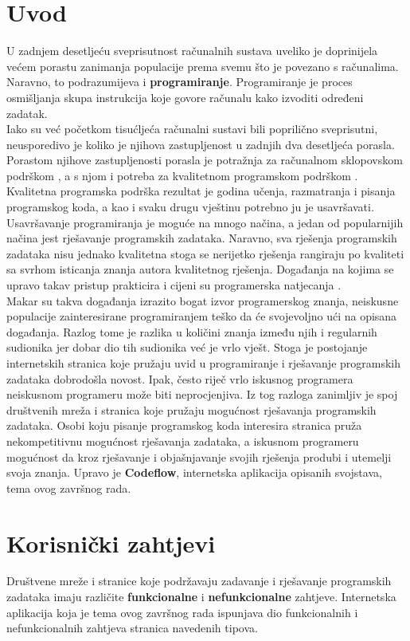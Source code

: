 \documentclass[times, utf8, zavrsni, numeric]{fer}
\begin{document}
	\chapter{Uvod}
	U zadnjem desetljeću sveprisutnost računalnih sustava uveliko je doprinijela većem porastu zanimanja populacije prema svemu što je povezano s računalima.  Naravno, to podrazumijeva i  \textbf{programiranje}. Programiranje je proces osmišljanja skupa instrukcija koje govore računalu kako izvoditi određeni zadatak.\\
	Iako su već početkom tisućljeća računalni sustavi bili poprilično sveprisutni, neusporedivo je koliko je njihova zastupljenost u zadnjih dva desetljeća porasla. Porastom njihove zastupljenosti porasla je potražnja za računalnom sklopovskom podrškom , a s njom i potreba za kvalitetnom programskom podrškom . Kvalitetna programska podrška rezultat je godina učenja, razmatranja i pisanja programskog koda, a kao i svaku drugu vještinu potrebno ju je usavršavati. Usavršavanje programiranja je moguće na mnogo načina, a jedan od popularnijih načina jest rješavanje programskih zadataka. Naravno, sva rješenja programskih zadataka nisu jednako kvalitetna stoga se nerijetko rješenja rangiraju po kvaliteti sa svrhom isticanja znanja autora kvalitetnog rješenja. Događanja na kojima se upravo takav pristup prakticira i cijeni su programerska natjecanja .\\
	Makar su takva događanja izrazito bogat izvor programerskog znanja, neiskusne populacije zainteresirane programiranjem teško da će svojevoljno ući na opisana događanja. Razlog tome je razlika u količini znanja između njih i regularnih sudionika jer dobar dio tih sudionika već je vrlo vješt. Stoga je postojanje internetskih stranica koje pružaju uvid u programiranje i rješavanje programskih zadataka dobrodošla novost. Ipak, često riječ vrlo iskusnog programera neiskusnom programeru može biti neprocjenjiva. Iz tog razloga zanimljiv je spoj društvenih mreža  i stranica koje pružaju mogućnost rješavanja programskih zadataka. Osobi koju pisanje programskog koda interesira stranica pruža nekompetitivnu mogućnost rješavanja zadataka, a iskusnom programeru mogućnost da kroz rješavanje i objašnjavanje svojih rješenja produbi i utemelji svoja znanja. Upravo je \textbf{Codeflow}, internetska aplikacija opisanih svojstava, tema ovog završnog rada.
	
	\chapter{Korisnički zahtjevi}
	\label{cha:zahtjevi}
	Društvene mreže i stranice koje podržavaju zadavanje i rješavanje programskih zadataka imaju različite \textbf{funkcionalne} i \textbf{nefunkcionalne} zahtjeve. Internetska aplikacija koja je tema ovog završnog rada ispunjava dio funkcionalnih i nefunkcionalnih zahtjeva stranica navedenih tipova.
	
\end{document}
